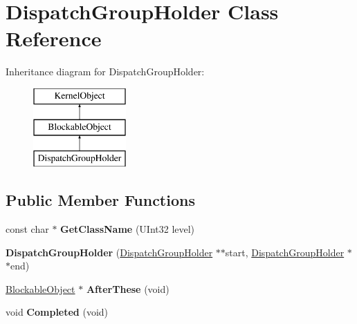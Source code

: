 \hypertarget{class_dispatch_group_holder}{}\section{Dispatch\+Group\+Holder Class Reference}
\label{class_dispatch_group_holder}
Inheritance diagram for Dispatch\+Group\+Holder\+:\begin{figure}[H]
\begin{center}
\leavevmode
\includegraphics[height=3.000000cm]{class_dispatch_group_holder}
\end{center}
\end{figure}
\subsection*{Public Member Functions}
\begin{DoxyCompactItemize}
\item 
\mbox{\label{class_dispatch_group_holder_aae21b4b1b4450fbe91c72f23c3c05740}} 
const char $\ast$ {\bfseries Get\+Class\+Name} (U\+Int32 level)
\item 
\mbox{\label{class_dispatch_group_holder_ab8fbf08463a7fbc1cc5e45907f8c050c}} 
{\bfseries Dispatch\+Group\+Holder} (\hyperlink{class_dispatch_group_holder}{Dispatch\+Group\+Holder} $\ast$$\ast$start, \hyperlink{class_dispatch_group_holder}{Dispatch\+Group\+Holder} $\ast$$\ast$end)
\item 
\mbox{\label{class_dispatch_group_holder_a2c804da5523078a19dd0df85314805ea}} 
\hyperlink{class_blockable_object}{Blockable\+Object} $\ast$ {\bfseries After\+These} (void)
\item 
\mbox{\label{class_dispatch_group_holder_aa8d9db75b9364a749adff5aaf5f2641d}} 
void {\bfseries Completed} (void)
\end{DoxyCompactItemize}
